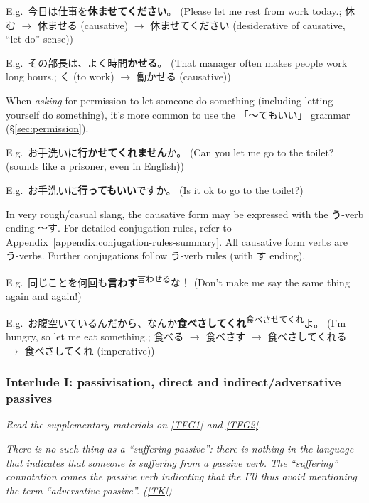 \documentclass[../nihongo-gakushuu-kyouzai.tex]{subfiles}
\begin{document}
E.g.\ 今日は仕事を\textbf{休ませてください}。 (Please let me rest from work today.; 休む $\to$ 休ませる (causative) $\to$ 休ませてください (desiderative of causative, ``let-do'' sense))

E.g.\ その部長は、よく時間\textbf{かせる}。 (That manager often makes people work long hours.; く (to work) $\to$ 働かせる (causative))

When \emph{asking} for permission to let someone do something (including letting yourself do something), it's more common to use the 「〜てもいい」 grammar (\S\ref{sec:permission}).

E.g.\ お手洗いに\textbf{行かせてくれません}か。 (Can you let me go to the toilet? (sounds like a prisoner, even in English))

E.g.\ お手洗いに\textbf{行ってもいい}ですか。 (Is it ok to go to the toilet?)

In very rough/casual slang, the causative form may be expressed with the う-verb ending 〜す. For detailed conjugation rules, refer to Appendix~\ref{appendix:conjugation-rules-summary}. All causative form verbs are う-verbs. Further conjugations follow う-verb rules (with す ending).

E.g.\ 同じことを何回も\textbf{言わす}\textsuperscript{言わせる}な！ (Don't make me say the same thing again and again!)

E.g.\ お腹空いているんだから、なんか\textbf{食べさしてくれ}\textsuperscript{食べさせてくれ}よ。 (I'm hungry, so let me eat something.; 食べる $\to$ 食べさす $\to$ 食べさしてくれる $\to$ 食べさしてくれ (imperative))

\color{lightgray}
\subsubsection{Interlude I: passivisation, direct and indirect/adversative passives} \label{sec:direct-and-indirect-adversative-passive}
\emph{Read the supplementary materials on \href{https://www.tofugu.com/japanese-grammar/verb-passive-form-rareru\#direct-vs-indirect-passive}{[TFG1]} and \href{https://www.tofugu.com/japanese-grammar/particle-ni/\#in-passive-sentences}{[TFG2]}.}

\emph{There is no such thing as a ``suffering passive'': there is nothing in the language that indicates that someone is suffering from a passive verb. The ``suffering'' connotation comes the passive verb indicating that the  I'll thus avoid mentioning the term ``adversative passive''. (\href{https://www.guidetojapanese.org/blog/2005/09/09/no-suffering-passive/}{[TK]})}
\end{document}
